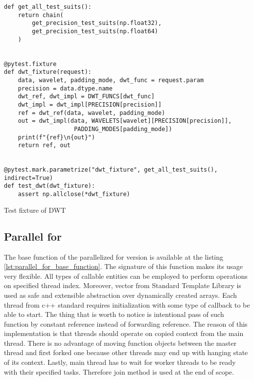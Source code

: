 \begin{listing}[!htb]
\begin{verbatim}
def get_all_test_suits():
    return chain(
        get_precision_test_suits(np.float32),
        get_precision_test_suits(np.float64)
    )


@pytest.fixture
def dwt_fixture(request):
    data, wavelet, padding_mode, dwt_func = request.param
    precision = data.dtype.name
    dwt_ref, dwt_impl = DWT_FUNCS[dwt_func]
    dwt_impl = dwt_impl[PRECISION[precision]]
    ref = dwt_ref(data, wavelet, padding_mode)
    out = dwt_impl(data, WAVELETS[wavelet][PRECISION[precision]],
                    PADDING_MODES[padding_mode])
    print(f"{ref}\n{out}")
    return ref, out


@pytest.mark.parametrize("dwt_fixture", get_all_test_suits(), indirect=True)
def test_dwt(dwt_fixture):
    assert np.allclose(*dwt_fixture)
\end{verbatim}
\caption{Test fixture of DWT}
\label{lst:dwt_test_fixture}
\end{listing}

\subsection{Parallel for} \label{sec:parallel_for}

The base function of the parallelized for version is available at the listing \ref{lst:parallel_for_base_function}.
The signature of this function makes its usage very flexible. All types of callable entities
can be employed to perform operations on specified thread index. Moreover, vector from Standard
Template Library is used as safe and extensible abstraction over dynamically created arrays.
Each thread from c++ standard requires initialization with some type of callback to
be able to start. The thing that is worth to notice is intentional pass of such function by
constant reference instead of forwarding reference. The reason of this implementation is that
threads should operate on copied context from the main thread. There is no advantage of moving
function objects between the master thread and first forked one because other threads may
end up with hanging state of its context. Lastly, main thread has to wait for worker threads
to be ready with their specified tasks. Therefore join method is used at the end of scope.

